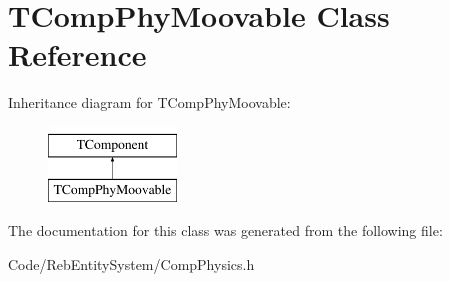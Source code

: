 \hypertarget{class_t_comp_phy_moovable}{}\section{T\+Comp\+Phy\+Moovable Class Reference}
\label{class_t_comp_phy_moovable}
Inheritance diagram for T\+Comp\+Phy\+Moovable\+:\begin{figure}[H]
\begin{center}
\leavevmode
\includegraphics[height=2.000000cm]{class_t_comp_phy_moovable}
\end{center}
\end{figure}


The documentation for this class was generated from the following file\+:\begin{DoxyCompactItemize}
\item 
Code/\+Reb\+Entity\+System/Comp\+Physics.\+h\end{DoxyCompactItemize}
